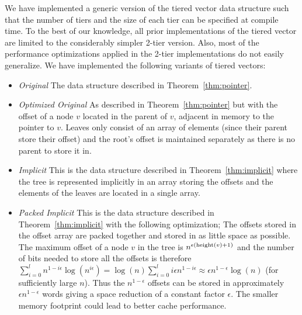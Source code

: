 \label{sec:implementation}
We have implemented a generic version of the tiered vector data structure such
that the number of tiers and the size of each tier can be specified at compile
time. To the best of our knowledge, all prior implementations of the tiered vector are limited to the considerably simpler 2-tier version.
Also, most of the performance optimizations applied in the 2-tier
implementations do not easily generalize.
We have implemented the following variants of tiered vectors:
\begin{itemize}

    \item \textit{Original}
        The data structure described in Theorem~\ref{thm:pointer}.

    \item \textit{Optimized Original}
        As described in Theorem~\ref{thm:pointer}
        but with the offset of a node $v$ located
        in the parent of $v$, adjacent in memory to the
        pointer to $v$. Leaves only consist of an array of elements
        (since their parent store their offset)
        and the root's offset is maintained separately
        as there is no parent to store it in.

    \item \textit{Implicit}
        This is the data structure described in Theorem~\ref{thm:implicit}
        where the tree is represented implicitly in an array
        storing the offsets and the elements of the leaves are
        located in a single array.

    \item\textit{Packed Implicit}
        This is the data structure described in Theorem~\ref{thm:implicit}
        with the following optimization;
        The offsets stored in the offset array
        are packed together and stored in as little space as possible.
        The maximum offset of a node $v$ in the tree is
        $n^{\epsilon(\mathrm{height}(v)+1)}$ and the
        number of bits needed to store all the offsets is therefore $\sum_{i=0}^l
        n^{1-i\epsilon}  \log(n^{i\epsilon}) = \log(n) \sum_{i=0}^l i\epsilon
        n^{1-i\epsilon}  \approx \epsilon n^{1-\epsilon} \log(n)$ (for sufficiently large $n$).
        Thus the $n^{1-\epsilon}$ offsets can
        be stored in approximately $\epsilon n^{1-\epsilon}$ words giving a space reduction
        of a constant factor $\epsilon$.
        The smaller memory footprint could lead to better cache performance.


\end{itemize}
